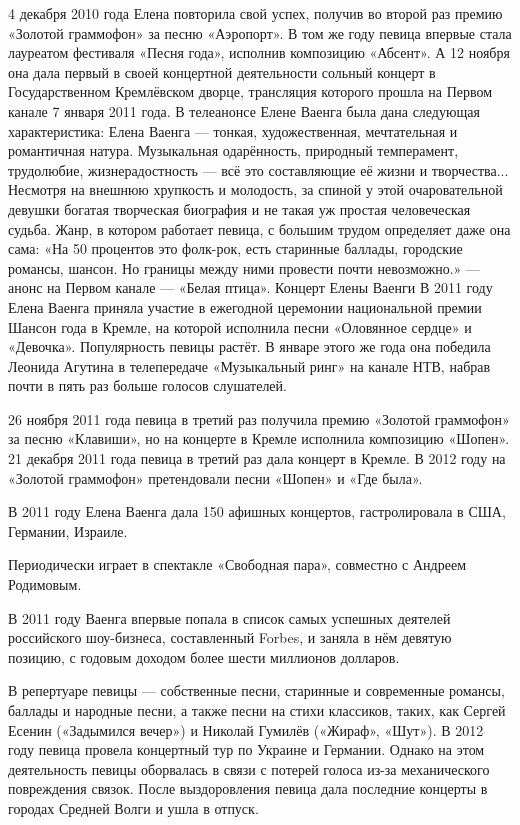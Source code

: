 4 декабря 2010 года Елена повторила свой успех, получив во второй раз премию «Золотой граммофон» за песню «Аэропорт». В том же году певица впервые стала лауреатом фестиваля «Песня года», исполнив композицию «Абсент». А 12 ноября она дала первый в своей концертной деятельности сольный концерт в Государственном Кремлёвском дворце, трансляция которого прошла на Первом канале 7 января 2011 года. В телеанонсе Елене Ваенга была дана следующая характеристика:
Елена Ваенга --- тонкая, художественная, мечтательная и романтичная натура. Музыкальная одарённость, природный темперамент, трудолюбие, жизнерадостность --- всё это составляющие её жизни и творчества... Несмотря на внешнюю хрупкость и молодость, за спиной у этой очаровательной девушки богатая творческая биография и не такая уж простая человеческая судьба. Жанр, в котором работает певица, с большим трудом определяет даже она сама: «На 50 процентов это фолк-рок, есть старинные баллады, городские романсы, шансон. Но границы между ними провести почти невозможно.»
--- анонс на Первом канале --- «Белая птица». Концерт Елены Ваенги
В 2011 году Елена Ваенга приняла участие в ежегодной церемонии национальной премии Шансон года в Кремле, на которой исполнила песни «Оловянное сердце» и «Девочка». Популярность певицы растёт. В январе этого же года она победила Леонида Агутина в телепередаче «Музыкальный ринг» на канале НТВ, набрав почти в пять раз больше голосов слушателей.

26 ноября 2011 года певица в третий раз получила премию «Золотой граммофон» за песню «Клавиши», но на концерте в Кремле исполнила композицию «Шопен». 21 декабря 2011 года певица в третий раз дала концерт в Кремле. В 2012 году на «Золотой граммофон» претендовали песни «Шопен» и «Где была».

В 2011 году Елена Ваенга дала 150 афишных концертов, гастролировала в США, Германии, Израиле.

Периодически играет в спектакле «Свободная пара», совместно с Андреем Родимовым.

В 2011 году Ваенга впервые попала в список самых успешных деятелей российского шоу-бизнеса, составленный Forbes, и заняла в нём девятую позицию, с годовым доходом более шести миллионов долларов.

В репертуаре певицы --- собственные песни, старинные и современные романсы, баллады и народные песни, а также песни на стихи классиков, таких, как Сергей Есенин («Задымился вечер») и Николай Гумилёв («Жираф», «Шут»). В 2012 году певица провела концертный тур по Украине и Германии. Однако на этом деятельность певицы оборвалась в связи с потерей голоса из-за механического повреждения связок. После выздоровления певица дала последние концерты в городах Средней Волги и ушла в отпуск.

